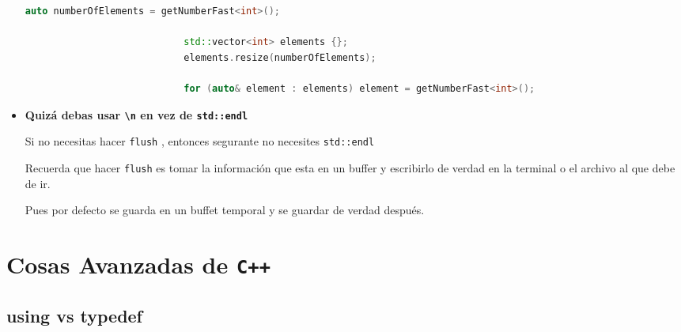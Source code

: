 \documentclass[12pt, fleqn]{report}                             %
\theoremstyle{break}                                            %
\newcommand{\textCode}[1]  { \texttt{#1} }                      %
\newcommand{\Cpp}{\ignorespaces\textCode{C++}}                  %
\begin{document}
\begin{itemize}
\begin{lstlisting}[language=C++, gobble=28]
                            auto numberOfElements = getNumberFast<int>();

                            std::vector<int> elements {};
                            elements.resize(numberOfElements);

                            for (auto& element : elements) element = getNumberFast<int>();
                        \end{lstlisting}

                    \clearpage
                    \item \textbf{Quizá debas usar \textCode{\textbackslash n} en vez de \textCode{std::endl}}
                        
                        Si no necesitas hacer 
                        \textCode{flush}, entonces segurante no necesites \textCode{std::endl}
                        
                        Recuerda que hacer \textCode{flush} es tomar la información que 
                        esta en un buffer y escribirlo de verdad en la terminal o el archivo al que debe de ir.

                        Pues por defecto se guarda en un buffet temporal y se guardar de verdad después.
                \end{itemize}


    \clearpage
    \chapter{Cosas Avanzadas de \Cpp}

        \clearpage
        \section{using vs typedef}  


        \clearpage
\end{document}
